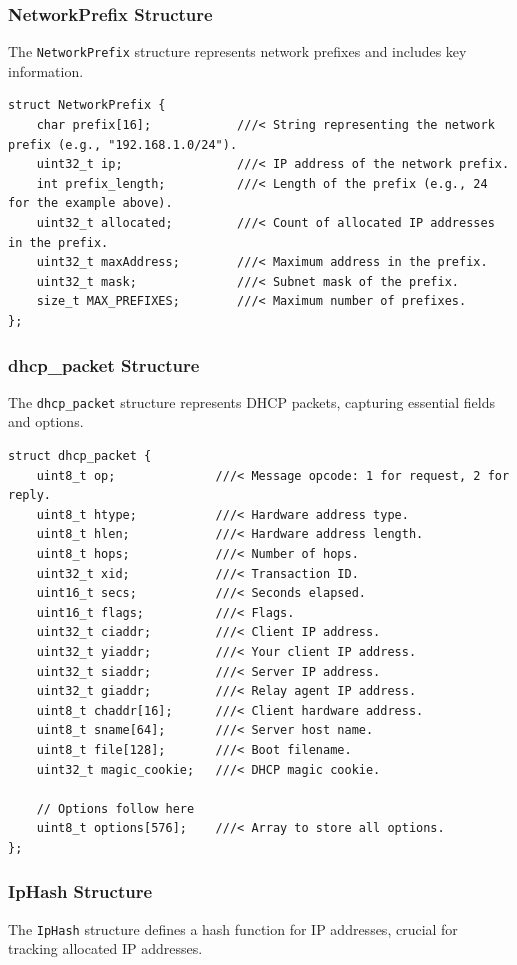 \documentclass[a4paper]{article}
\begin{document}
\subsubsection{NetworkPrefix Structure}
The \texttt{NetworkPrefix} structure represents network prefixes and includes key information.

\begin{verbatim}
struct NetworkPrefix {
    char prefix[16];            ///< String representing the network prefix (e.g., "192.168.1.0/24").
    uint32_t ip;                ///< IP address of the network prefix.
    int prefix_length;          ///< Length of the prefix (e.g., 24 for the example above).
    uint32_t allocated;         ///< Count of allocated IP addresses in the prefix.
    uint32_t maxAddress;        ///< Maximum address in the prefix.
    uint32_t mask;              ///< Subnet mask of the prefix.
    size_t MAX_PREFIXES;        ///< Maximum number of prefixes.
};
\end{verbatim}
\newpage
\subsubsection{dhcp\_packet Structure}
The \texttt{dhcp\_packet} structure represents DHCP packets, capturing essential fields and options.

\begin{verbatim}
struct dhcp_packet {
    uint8_t op;              ///< Message opcode: 1 for request, 2 for reply.
    uint8_t htype;           ///< Hardware address type.
    uint8_t hlen;            ///< Hardware address length.
    uint8_t hops;            ///< Number of hops.
    uint32_t xid;            ///< Transaction ID.
    uint16_t secs;           ///< Seconds elapsed.
    uint16_t flags;          ///< Flags.
    uint32_t ciaddr;         ///< Client IP address.
    uint32_t yiaddr;         ///< Your client IP address.
    uint32_t siaddr;         ///< Server IP address.
    uint32_t giaddr;         ///< Relay agent IP address.
    uint8_t chaddr[16];      ///< Client hardware address.
    uint8_t sname[64];       ///< Server host name.
    uint8_t file[128];       ///< Boot filename.
    uint32_t magic_cookie;   ///< DHCP magic cookie.

    // Options follow here
    uint8_t options[576];    ///< Array to store all options.
};
\end{verbatim}

\subsubsection{IpHash Structure}
The \texttt{IpHash} structure defines a hash function for IP addresses, crucial for tracking allocated IP addresses.
\end{document}
